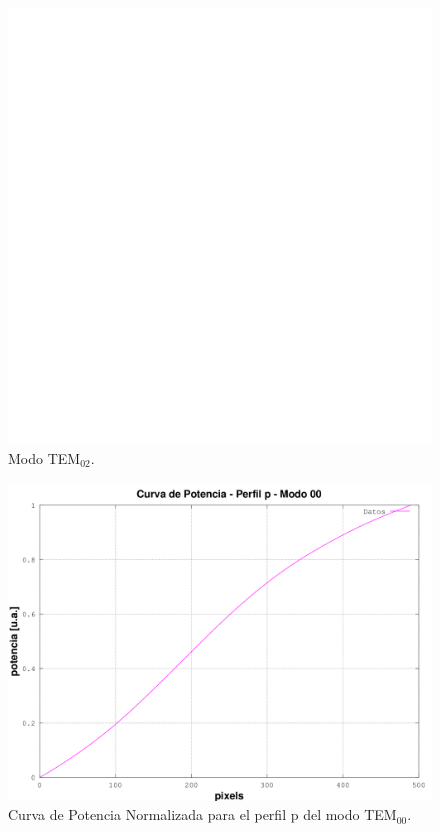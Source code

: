 \documentclass[10pt, a4paper]{article}%
\begin{document}
\begin{multicols}{2}
\begin{figure}[H]
    \centering    
    \includegraphics[scale=0.23]{Graficos/tem02.png}
    \caption{Modo TEM$_{02}$.}
    \label{fig:modo_tem02}
\end{figure}


\begin{figure}[H]
    \centering    
    \includegraphics[scale=0.35]{Graficos/plt_pot_tem00.png}
    \caption{Curva de Potencia Normalizada para el perfil p del modo TEM$_{00}$.}
    \label{fig:pot_modo_tem00}
\end{figure}


\end{multicols}
\end{document}
